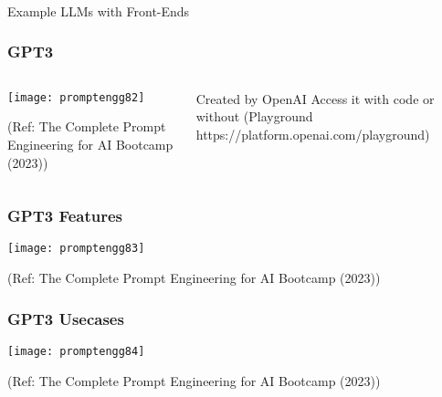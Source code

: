 

\begin{frame}[fragile]\frametitle{}
\begin{center}
{\Large Example LLMs with Front-Ends}

\end{center}
\end{frame}



\begin{frame}[fragile]\frametitle{GPT3}


\begin{columns}
    \begin{column}[T]{0.6\linewidth}
		\begin{center}
		\texttt{[image: promptengg82]}

		{\tiny (Ref: The Complete Prompt Engineering for AI Bootcamp (2023))}
		\end{center}	
    \end{column}
    \begin{column}[T]{0.4\linewidth}
		Created by OpenAI
		Access it with code or without (Playground https://platform.openai.com/playground)
    \end{column}
  \end{columns}
\end{frame}

\begin{frame}[fragile]\frametitle{GPT3 Features}


		\begin{center}
		\texttt{[image: promptengg83]}

		{\tiny (Ref: The Complete Prompt Engineering for AI Bootcamp (2023))}
		\end{center}	

\end{frame}


\begin{frame}[fragile]\frametitle{GPT3 Usecases}


		\begin{center}
		\texttt{[image: promptengg84]}

		{\tiny (Ref: The Complete Prompt Engineering for AI Bootcamp (2023))}
		\end{center}	

\end{frame}

